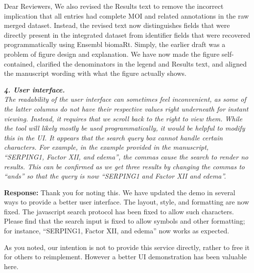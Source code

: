 \documentclass[12pt,a4paper]{letter}
\begin{document}
\begin{letter}{Dear Reviewers,}
We also revised the Results text to remove the incorrect implication that all entries had complete MOI and related annotations in the raw merged dataset. Instead, the revised text now distinguishes fields that were directly present in the integrated dataset from identifier fields that were recovered programmatically using Ensembl biomaRt. Simply, the earlier draft was a problem of figure design and explanation. We have now made the figure self-contained, clarified the denominators in the legend and Results text, and aligned the manuscript wording with what the figure actually shows.


\textit{\textbf{4. User interface.}\\
The readability of the user interface can sometimes feel inconvenient, as some of the latter columns do not have their respective values right underneath for instant viewing. Instead, it requires that we scroll back to the right to view them. While the tool will likely mostly be used programmatically, it would be helpful to modify this in the UI.
It appears that the search query box cannot handle certain characters. For example, in the example provided in the manuscript, “SERPING1, Factor XII, and edema”, the commas cause the search to render no results. This can be confirmed as we get three results by changing the commas to “ands” so that the query is now “SERPING1 and Factor XII and edema”.
}

\textbf{Response:} Thank you for noting this. 
We have updated the demo in several ways to provide a better user interface. 
The layout, style, and formatting are now fixed. 
The javascript search protocol has been fixed to allow such characters. Please find that the search input is fixed to allow symbols and other formatting; for instance,  “SERPING1, Factor XII, and edema” now works as expected.

As you noted, our intention is not to provide this service directly, rather to free it for others to reimplement. However a better UI demonstration has been valuable here.


\end{letter}
\end{document}
